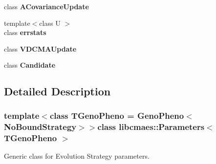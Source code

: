 \begin{DoxyCompactItemize}
\item 
\hypertarget{classlibcmaes_1_1Parameters_a81af003765a6521a192e5a37612c2fb5}{class {\bfseries A\+Covariance\+Update}}\label{classlibcmaes_1_1Parameters_a81af003765a6521a192e5a37612c2fb5}

\item 
\hypertarget{classlibcmaes_1_1Parameters_a867bde5f83097a4db1f667a3911efbae}{{\footnotesize template$<$class U $>$ }\\class {\bfseries errstats}}\label{classlibcmaes_1_1Parameters_a867bde5f83097a4db1f667a3911efbae}

\item 
\hypertarget{classlibcmaes_1_1Parameters_a3fceefe6a1e378ff9fef5d97117e5f47}{class {\bfseries V\+D\+C\+M\+A\+Update}}\label{classlibcmaes_1_1Parameters_a3fceefe6a1e378ff9fef5d97117e5f47}

\item 
\hypertarget{classlibcmaes_1_1Parameters_afb3142edf2def9ad64b319487505f2eb}{class {\bfseries Candidate}}\label{classlibcmaes_1_1Parameters_afb3142edf2def9ad64b319487505f2eb}

\end{DoxyCompactItemize}


\subsection{Detailed Description}
\subsubsection*{template$<$class T\+Geno\+Pheno = Geno\+Pheno$<$\+No\+Bound\+Strategy$>$$>$class libcmaes\+::\+Parameters$<$ T\+Geno\+Pheno $>$}

Generic class for Evolution Strategy parameters. 

